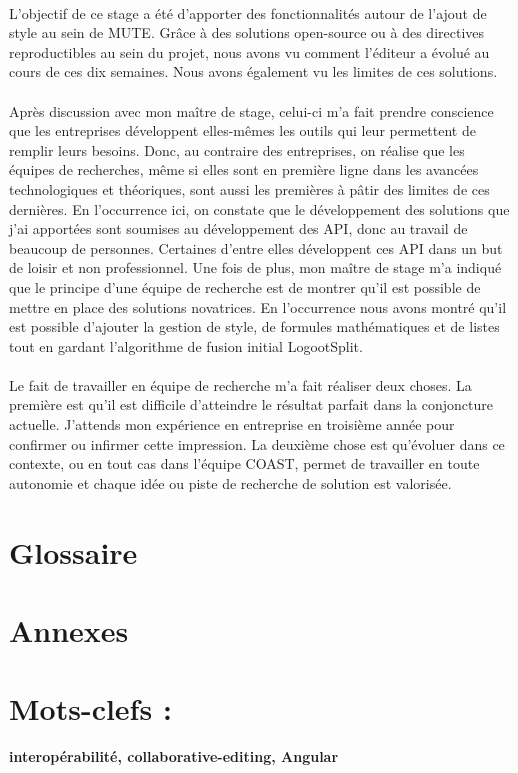 \documentclass[12pt]{article}
\begin{document}
\paragraph{}
L'objectif de ce stage a été d'apporter des fonctionnalités autour de l'ajout de style au sein de MUTE. Grâce à des solutions open-source ou à des directives reproductibles au sein du projet, nous avons vu comment l'éditeur a évolué au cours de ces dix semaines. Nous avons également vu les limites de ces solutions.
\paragraph{}
Après discussion avec mon maître de stage, celui-ci m'a fait prendre conscience que les entreprises développent elles-mêmes les outils qui leur permettent de remplir leurs besoins. Donc, au contraire des entreprises, on réalise que les équipes de recherches, même si elles sont en première ligne dans les avancées technologiques et théoriques, sont aussi les premières à pâtir des limites de ces dernières. En l'occurrence ici, on constate que le développement des solutions que j'ai apportées sont soumises au développement des API, donc au travail de beaucoup de personnes. Certaines d'entre elles développent ces API dans un but de loisir et non professionnel. Une fois de plus, mon maître de stage m'a indiqué que le principe d'une équipe de recherche est de montrer qu'il est possible de mettre en place des solutions novatrices. En l'occurrence nous avons montré qu'il est possible d'ajouter la gestion de style, de formules mathématiques et de listes tout en gardant l'algorithme de fusion initial LogootSplit.
\paragraph{}
Le fait de travailler en équipe de recherche m'a fait réaliser deux choses. La première est qu'il est difficile d'atteindre le résultat parfait dans la conjoncture actuelle. J'attends mon expérience en entreprise en troisième année pour confirmer ou infirmer cette impression. La deuxième chose est qu'évoluer dans ce contexte, ou en tout cas dans l'équipe COAST, permet de travailler en toute autonomie et chaque idée ou piste de recherche de solution est valorisée.

\newpage
\printbibliography[heading=bibintoc,title={Webographie}]

\newpage
{}
\section*{Glossaire}

\clearpage

\newpage
{}
\section*{Annexes}

\newpage
\section*{Mots-clefs :}
\textbf{interopérabilité, collaborative-editing, Angular}
\end{document}
